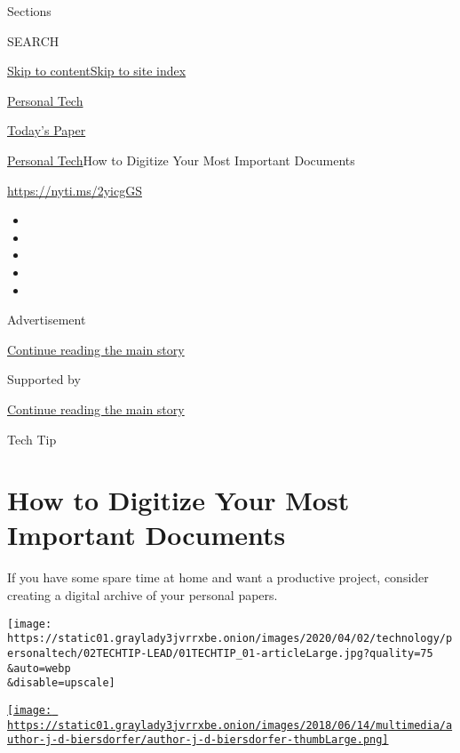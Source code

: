 Sections

SEARCH

\protect\hyperlink{site-content}{Skip to
content}\protect\hyperlink{site-index}{Skip to site index}

\href{https://www.nytimes3xbfgragh.onion/section/technology/personaltech}{Personal
Tech}

\href{https://myaccount.nytimes3xbfgragh.onion/auth/login?response_type=cookie\&client_id=vi}{}

\href{https://www.nytimes3xbfgragh.onion/section/todayspaper}{Today's
Paper}

\href{/section/technology/personaltech}{Personal Tech}\textbar{}How to
Digitize Your Most Important Documents

\url{https://nyti.ms/2yicgGS}

\begin{itemize}
\item
\item
\item
\item
\item
\end{itemize}

Advertisement

\protect\hyperlink{after-top}{Continue reading the main story}

Supported by

\protect\hyperlink{after-sponsor}{Continue reading the main story}

Tech Tip

\hypertarget{how-to-digitize-your-most-important-documents}{%
\section{How to Digitize Your Most Important
Documents}\label{how-to-digitize-your-most-important-documents}}

If you have some spare time at home and want a productive project,
consider creating a digital archive of your personal papers.

\texttt{[image: https://static01.graylady3jvrrxbe.onion/images/2020/04/02/technology/personaltech/02TECHTIP-LEAD/01TECHTIP\_01-articleLarge.jpg?quality=75\\\&auto=webp\\\&disable=upscale]}

\href{https://www.nytimes3xbfgragh.onion/by/j-d-biersdorfer}{\texttt{[image: https://static01.graylady3jvrrxbe.onion/images/2018/06/14/multimedia/author-j-d-biersdorfer/author-j-d-biersdorfer-thumbLarge.png]}}

